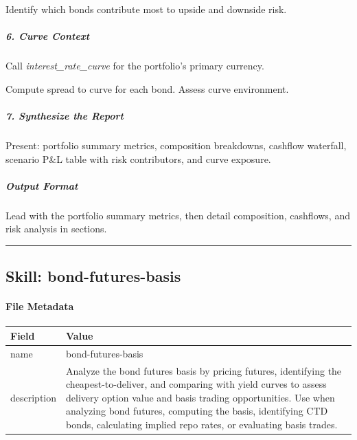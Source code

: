 \documentclass[11pt]{article}
\begin{document}
Identify which bonds contribute most to upside and downside risk.


\subparagraph{6. Curve Context}\mbox{}\par

Call \emph{interest\_\allowbreak{}rate\_\allowbreak{}curve} for the portfolio's primary currency.


Compute spread to curve for each bond. Assess curve environment.


\subparagraph{7. Synthesize the Report}\mbox{}\par

Present: portfolio summary metrics, composition breakdowns, cashflow waterfall, scenario P\&L table with risk contributors, and curve exposure.


\subparagraph{Output Format}\mbox{}\par

Lead with the portfolio summary metrics, then detail composition, cashflows, and risk analysis in sections.


\vspace{0.8em}\hrule\vspace{0.8em}

\subsection{Skill: bond-futures-basis}\label{file:lseg-skills-bond-futures-basis-SKILL.md}

\paragraph{File Metadata}\mbox{}\par
\begingroup
\small
\setlength{\tabcolsep}{2pt}
\begin{longtable}{>{\RaggedRight\arraybackslash\hspace{0pt}}p{}>{\RaggedRight\arraybackslash\hspace{0pt}}p{}}
\toprule
{} \textbf{Field} & \textbf{Value} \\
\midrule
{} name & bond-futures-basis \\
{} description & Analyze the bond futures basis by pricing futures, identifying the cheapest-to-deliver, and comparing with yield curves to assess delivery option value and basis trading opportunities. Use when analyzing bond futures, computing the basis, identifying CTD bonds, calculating implied repo rates, or evaluating basis trades. \\
\bottomrule
\end{longtable}
\endgroup
\end{document}
